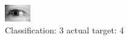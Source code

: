 \begin{figure}[h!]
\begin{center}
\includegraphics[width=0.60\columnwidth]{figures/ID3187_class_3_target_4.png}
\end{center}
\caption{ Classification: 3 actual target: 4}
\label{fig:ID3187_class_3_target_4}
\end{figure}
